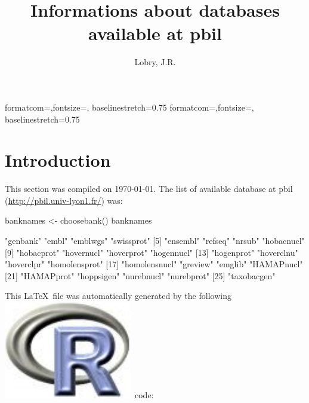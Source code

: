 \documentclass{article}
\title{Informations about databases available at pbil}
\author{Lobry, J.R.}
\begin{document}
%
%
{formatcom={\color{Sinput}},fontsize=\footnotesize, baselinestretch=0.75}
{formatcom={\color{Soutput}},fontsize=\footnotesize, baselinestretch=0.75}
%
%
\newcommand{\Rlogo}{\protect\includegraphics[height=1.8ex,keepaspectratio]{../figs/Rlogo.pdf}}
%
%
\newcommand{\seqinr}{\texttt{seqin\bf{R}}}
\newcommand{\Seqinr}{\texttt{Seqin\bf{R}}}
%
%
%
%
%


\maketitle
\label{subsequence}

\section{Introduction}
This section was compiled on \today. The list of available database at pbil 
(\url{http://pbil.univ-lyon1.fr/}) was:

\begin{Schunk}
\begin{Sinput}
 banknames <- choosebank()
 banknames
\end{Sinput}
\begin{Soutput}
 [1] "genbank"      "embl"         "emblwgs"      "swissprot"   
 [5] "ensembl"      "refseq"       "nrsub"        "hobacnucl"   
 [9] "hobacprot"    "hovernucl"    "hoverprot"    "hogennucl"   
[13] "hogenprot"    "hoverclnu"    "hoverclpr"    "homolensprot"
[17] "homolensnucl" "greview"      "emglib"       "HAMAPnucl"   
[21] "HAMAPprot"    "hoppsigen"    "nurebnucl"    "nurebprot"   
[25] "taxobacgen"  
\end{Soutput}
\end{Schunk}

This \LaTeX~file was automatically generated by the following \Rlogo{}~code:
\end{document}
